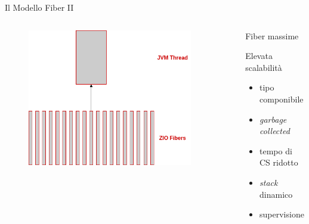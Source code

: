 \begin{frame}[fragile]{Il Modello Fiber II}

  \begin{columns}
    \begin{column}{.6\textwidth}
      \begin{figure}
        \centering
            \includegraphics[width=0.9\textwidth]{img/fibers.png}
            \label{Fibers mapping.}
        \end{figure}
    \end{column}
    \begin{column}{.35\textwidth}
      \begin{block}{\centering Fiber massime}
        \vspace{2mm}
        \vspace{2mm}
      \end{block}
      \vspace{4.5mm}
      \begin{block}{Elevata scalabilità}
        \begin{itemize}
          \item tipo componibile
          \item \textit{garbage collected}
          \item tempo di CS ridotto
          \item \textit{stack} dinamico
          \item supervisione
        \end{itemize}
      \end{block}
    \end{column}
  \end{columns}

\end{frame}

